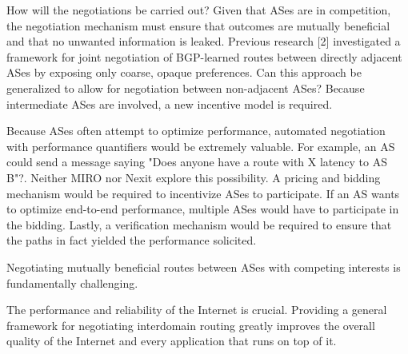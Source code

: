 \documentclass[12pt]{article}	%
\begin{document}
How will the negotiations be carried out? Given that ASes are in competition, the negotiation mechanism must ensure that
outcomes are mutually beneficial and that no unwanted information is leaked. Previous research [2]
investigated a framework for joint negotiation of BGP-learned routes between directly adjacent ASes by exposing only coarse,
opaque preferences. Can this approach be generalized to allow for negotiation between non-adjacent ASes? Because intermediate ASes are involved, a new
incentive model is required.

Because ASes often attempt to optimize performance, automated negotiation with
performance quantifiers would be extremely valuable. For example, an AS could
send a message saying "Does anyone have a route with X latency
to AS B"?. Neither MIRO nor Nexit explore this
possibility. A pricing and bidding mechanism would be required to incentivize
ASes to participate. If an AS wants to optimize end-to-end performance,
multiple ASes would have to participate in the bidding. Lastly, a verification
mechanism would be required to ensure that the paths in fact yielded the
performance solicited.
%


 Negotiating mutually beneficial routes between
ASes with competing interests is fundamentally challenging.

 The performance and reliability of the Internet is
crucial. Providing a general framework for negotiating
interdomain routing greatly improves the overall quality of the
Internet and every application that runs on top of it.
\end{document}
